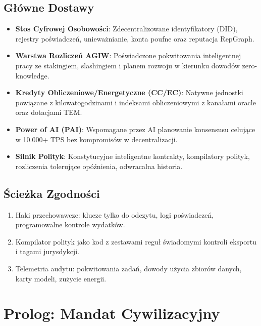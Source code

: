 \documentclass[11pt]{article}
\begin{document}
\subsection{Główne Dostawy}
\begin{itemize}[noitemsep]
  \item \textbf{Stos Cyfrowej Osobowości}: Zdecentralizowane identyfikatory (DID), rejestry poświadczeń, unieważnianie, konta poufne oraz reputacja RepGraph.
  \item \textbf{Warstwa Rozliczeń AGIW}: Poświadczone pokwitowania inteligentnej pracy ze stakingiem, slashingiem i planem rozwoju w kierunku dowodów zero-knowledge.
  \item \textbf{Kredyty Obliczeniowe/Energetyczne (CC/EC)}: Natywne jednostki powiązane z kilowatogodzinami i indeksami obliczeniowymi z kanałami oracle oraz dotacjami TEM.
  \item \textbf{Power of AI (PAI)}: Wspomagane przez AI planowanie konsensusu celujące w 10.000+ TPS bez kompromisów w decentralizacji.
  \item \textbf{Silnik Polityk}: Konstytucyjne inteligentne kontrakty, kompilatory polityk, rozliczenia tolerujące opóźnienia, odwracalna historia.
\end{itemize}

\subsection{Ścieżka Zgodności}
\begin{enumerate}[noitemsep]
  \item Haki przechowawcze: klucze tylko do odczytu, logi poświadczeń, programowalne kontrole wydatków.
  \item Kompilator polityk jako kod z zestawami reguł świadomymi kontroli eksportu i tagami jurysdykcji.
  \item Telemetria audytu: pokwitowania zadań, dowody użycia zbiorów danych, karty modeli, zużycie energii.
\end{enumerate}

\section{Prolog: Mandat Cywilizacyjny}
\end{document}

